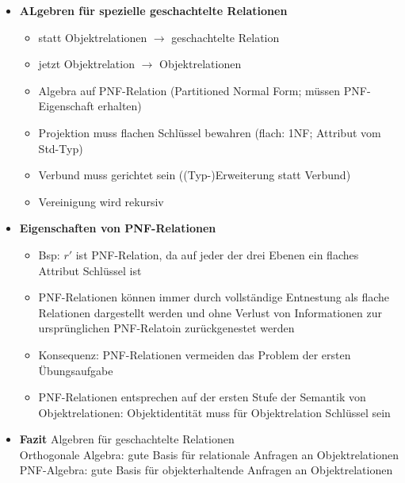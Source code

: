 \begin{itemize}
	\item \textbf{ALgebren für spezielle geschachtelte Relationen}
	\begin{itemize}
		\item statt Objektrelationen $\to$ geschachtelte Relation
		\item jetzt Objektrelation $\to$ Objektrelationen
		\item Algebra auf PNF-Relation (Partitioned Normal Form; müssen PNF-Eigenschaft erhalten)
		\item Projektion muss flachen Schlüssel bewahren (flach: 1NF; Attribut vom Std-Typ)
		\item Verbund muss gerichtet sein ((Typ-)Erweiterung statt Verbund)
		\item Vereinigung wird rekursiv
	\end{itemize}
	
	\item \textbf{Eigenschaften von PNF-Relationen}
	\begin{itemize}
		\item Bsp: $r'$ ist PNF-Relation, da auf jeder der drei Ebenen ein flaches Attribut Schlüssel ist
		\item PNF-Relationen können immer durch vollständige Entnestung als flache Relationen dargestellt werden und ohne Verlust von Informationen zur ursprünglichen PNF-Relatoin zurückgenestet werden
		\item Konsequenz: PNF-Relationen vermeiden das Problem der ersten Übungsaufgabe
		\item PNF-Relationen entsprechen auf der ersten Stufe der Semantik von Objektrelationen: Objektidentität muss für Objektrelation Schlüssel sein
	\end{itemize}
	\item \textbf{Fazit} Algebren für geschachtelte Relationen\\
	Orthogonale Algebra: gute Basis für relationale Anfragen an Objektrelationen\\
	PNF-Algebra: gute Basis für objekterhaltende Anfragen an Objektrelationen
\end{itemize}


